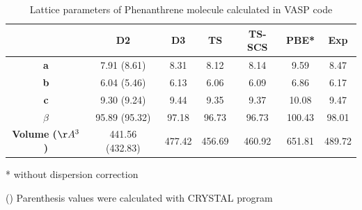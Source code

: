  		\begin{table}[H]
 			\caption{Lattice parameters of Phenanthrene molecule calculated in VASP code} \label{table-phenan}
 			\begin{center}
 				\begin{threeparttable}
 					\begin{tabular}{c c c c c c c}
 						\toprule
 						& \textbf{D2} & \textbf{D3} & \textbf{TS} & \textbf{TS-SCS} & \textbf{PBE*} & \textbf{Exp} \\
 						\midrule
 						\textbf{a} & 7.91 (8.61) & 8.31 & 8.12 & 8.14 & 9.59 & 8.47\\
 						\textbf{b}& 6.04 (5.46) & 6.13 & 6.06 & 6.09 & 6.86 & 6.17\\
 						\textbf{c}& 9.30 (9.24) & 9.44 & 9.35 & 9.37 & 10.08 & 9.47\\
 						\textbf{$\beta$} & 95.89 (95.32) & 97.18 & 96.73 & 96.73 & 100.43 & 98.01\\
 						\textbf{Volume ($\AA^{3}$)}& 441.56 (432.83) & 477.42 & 456.69 & 460.92 & 651.81 & 489.72\\
 						\bottomrule
 					\end{tabular}
 					
 					\begin{tablenotes}
 						\item[*] without dispersion correction
 						\item[()] Parenthesis values were calculated with CRYSTAL program
 					\end{tablenotes}
 				\end{threeparttable}
 			\end{center}
 		\end{table}
 	
